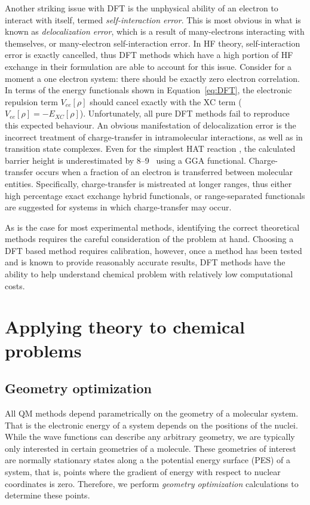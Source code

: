 Another striking issue with DFT is the unphysical ability of an electron to interact with itself, termed \emph{self-interaction error}. This is most obvious in what is known as \emph{delocalization error}, which is a result of many-electrons interacting with themselves, or many-electron self-interaction error. In HF theory, self-interaction error is exactly cancelled, thus DFT methods which have a high portion of HF exchange in their formulation are able to account for this issue. Consider for a moment a one electron system: there should be exactly zero electron correlation. In terms of the energy functionals shown in Equation~\ref{eq:DFT}, the electronic repulsion term $V_{ee}[\rho]$ should cancel exactly with the XC term ($V_{ee}[\rho] = -E_{XC}[\rho]$).\cite{Cramer2004} Unfortunately, all pure DFT methods fail to reproduce this expected behaviour. An obvious manifestation of delocalization error is the incorrect treatment of charge-transfer in intramolecular interactions,\cite{MoriSanchez2008,OterodelaRoza2014} as well as in transition state complexes. Even for the simplest HAT reaction , the calculated barrier height is underestimated by 8--9 \kcalmol\ using a GGA functional.\cite{Csonka1998} Charge-transfer occurs when a fraction of an electron is transferred between molecular entities. Specifically, charge-transfer is mistreated at longer ranges, thus either high percentage exact exchange hybrid functionals, or range-separated functionals are suggested for systems in which charge-transfer may occur.

As is the case for most experimental methods, identifying the correct theoretical methods requires the careful consideration of the problem at hand. Choosing a DFT based method requires calibration, however, once a method has been tested and is known to provide reasonably accurate results, DFT methods have the ability to help understand chemical problem with relatively low computational costs.

\section{Applying theory to chemical problems}

\subsection{Geometry optimization}

All QM methods depend parametrically on the geometry of a molecular system. That is the electronic energy of a system depends on the positions of the nuclei. While the wave functions can describe any arbitrary geometry, we are typically only interested in certain geometries of a molecule. These geometries of interest are normally stationary states along a the potential energy surface (PES) of a system, that is, points where the gradient of energy with respect to nuclear coordinates is zero. Therefore, we perform \emph{geometry optimization} calculations to determine these points.

